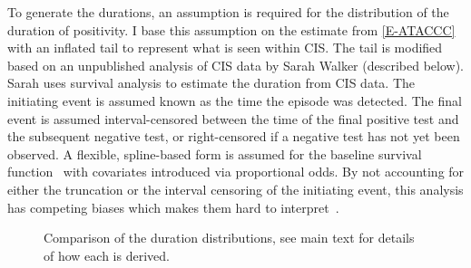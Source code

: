 \documentclass[thesis.tex]{subfiles}
\begin{document}
To generate the durations, an assumption is required for the distribution of the duration of positivity.
I base this assumption on the estimate from \cref{E-ATACCC} with an inflated tail to represent what is seen within CIS.
The tail is modified based on an unpublished analysis of CIS data by Sarah Walker (described below).
Sarah uses survival analysis to estimate the duration from CIS data.
The initiating event is assumed known as the time the episode was detected.
The final event is assumed interval-censored between the time of the final positive test and the subsequent negative test, or right-censored if a negative test has not yet been observed.
A flexible, spline-based form is assumed for the baseline survival function~\autocite{roystonSTPM,roystonFlexible} with covariates introduced via proportional odds.
By not accounting for either the truncation or the interval censoring of the initiating event, this analysis has competing biases which makes them hard to interpret~\autocite{cisMethodsONS}.

\begin{figure}
  \caption[Comparison of duration distributions]{Comparison of the duration distributions, see main text for details of how each is derived. \label{perf-test:fig:duration-dist}}
\end{figure}



\end{document}
